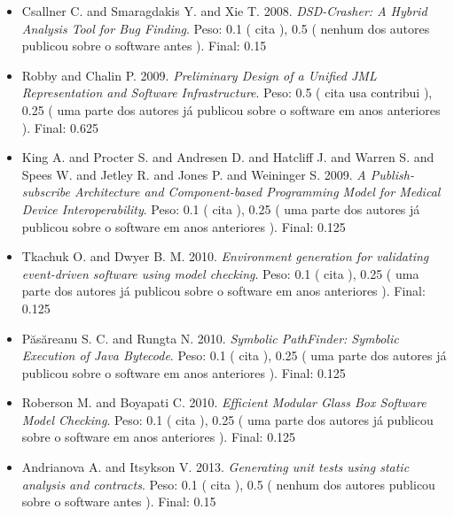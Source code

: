 \begin{itemize}
\item Csallner C. and Smaragdakis Y. and Xie T.
      2008.
        \textit{ DSD-Crasher: A Hybrid Analysis Tool for Bug Finding}.
      Peso:
      0.1 (
          cita
      ),
      0.5 (
nenhum dos autores publicou sobre o software antes
      ).
      Final:
      0.15

\item Robby and Chalin P.
      2009.
        \textit{ Preliminary Design of a Unified JML Representation and Software Infrastructure}.
      Peso:
      0.5 (
          cita
          usa
          contribui
      ),
      0.25 (
uma parte dos autores já publicou sobre o software em anos anteriores
      ).
      Final:
      0.625

\item King A. and Procter S. and Andresen D. and Hatcliff J. and Warren S. and Spees W. and Jetley R. and Jones P. and Weininger S.
      2009.
        \textit{ A Publish-subscribe Architecture and Component-based Programming Model for Medical Device Interoperability}.
      Peso:
      0.1 (
          cita
      ),
      0.25 (
uma parte dos autores já publicou sobre o software em anos anteriores
      ).
      Final:
      0.125

\item Tkachuk O. and Dwyer B. M.
      2010.
        \textit{ Environment generation for validating event-driven software using model checking}.
      Peso:
      0.1 (
          cita
      ),
      0.25 (
uma parte dos autores já publicou sobre o software em anos anteriores
      ).
      Final:
      0.125

\item P\u{a}s\u{a}reanu S. C. and Rungta N.
      2010.
        \textit{ Symbolic PathFinder: Symbolic Execution of Java Bytecode}.
      Peso:
      0.1 (
          cita
      ),
      0.25 (
uma parte dos autores já publicou sobre o software em anos anteriores
      ).
      Final:
      0.125

\item Roberson M. and Boyapati C.
      2010.
        \textit{ Efficient Modular Glass Box Software Model Checking}.
      Peso:
      0.1 (
          cita
      ),
      0.25 (
uma parte dos autores já publicou sobre o software em anos anteriores
      ).
      Final:
      0.125

\item Andrianova A. and Itsykson V.
      2013.
        \textit{ Generating unit tests using static analysis and contracts}.
      Peso:
      0.1 (
          cita
      ),
      0.5 (
nenhum dos autores publicou sobre o software antes
      ).
      Final:
      0.15


\end{itemize}
